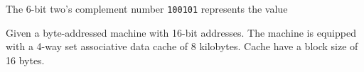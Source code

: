 \begin{mcquestion}
The 6-bit two's complement number \lstinline{100101} represents the value
\end{mcquestion}






\newpage
{}

Given a byte-addressed machine with 16-bit addresses.
The machine is equipped with a 4-way set associative data cache of 8 kilobytes.
Cache have a block size of 16 bytes.


